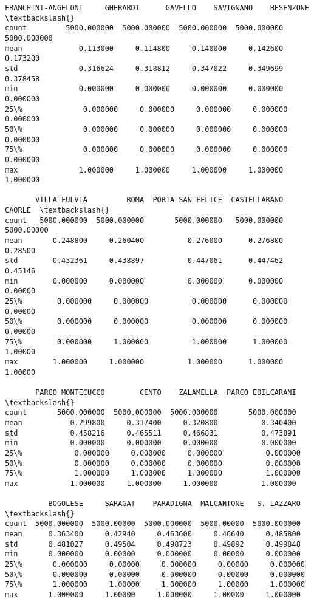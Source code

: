 \documentclass[11pt]{article}
\begin{document}
\begin{tcolorbox}[breakable, size=fbox, boxrule=.5pt, pad at break*=1mm, opacityfill=0]
\begin{Verbatim}[commandchars=\\\{\}]
       FRANCHINI-ANGELONI     GHERARDI      GAVELLO    SAVIGNANO    BESENZONE  \textbackslash{}
count         5000.000000  5000.000000  5000.000000  5000.000000  5000.000000
mean             0.113000     0.114800     0.140000     0.142600     0.173200
std              0.316624     0.318812     0.347022     0.349699     0.378458
min              0.000000     0.000000     0.000000     0.000000     0.000000
25\%              0.000000     0.000000     0.000000     0.000000     0.000000
50\%              0.000000     0.000000     0.000000     0.000000     0.000000
75\%              0.000000     0.000000     0.000000     0.000000     0.000000
max              1.000000     1.000000     1.000000     1.000000     1.000000

       VILLA FULVIA         ROMA  PORTA SAN FELICE  CASTELLARANO      CAORLE  \textbackslash{}
count   5000.000000  5000.000000       5000.000000   5000.000000  5000.00000
mean       0.248800     0.260400          0.276000      0.276800     0.28500
std        0.432361     0.438897          0.447061      0.447462     0.45146
min        0.000000     0.000000          0.000000      0.000000     0.00000
25\%        0.000000     0.000000          0.000000      0.000000     0.00000
50\%        0.000000     0.000000          0.000000      0.000000     0.00000
75\%        0.000000     1.000000          1.000000      1.000000     1.00000
max        1.000000     1.000000          1.000000      1.000000     1.00000

       PARCO MONTECUCCO        CENTO    ZALAMELLA  PARCO EDILCARANI  \textbackslash{}
count       5000.000000  5000.000000  5000.000000       5000.000000
mean           0.299800     0.317400     0.320800          0.340400
std            0.458216     0.465511     0.466831          0.473891
min            0.000000     0.000000     0.000000          0.000000
25\%            0.000000     0.000000     0.000000          0.000000
50\%            0.000000     0.000000     0.000000          0.000000
75\%            1.000000     1.000000     1.000000          1.000000
max            1.000000     1.000000     1.000000          1.000000

          BOGOLESE     SARAGAT    PARADIGNA  MALCANTONE   S. LAZZARO  \textbackslash{}
count  5000.000000  5000.00000  5000.000000  5000.00000  5000.000000
mean      0.363400     0.42940     0.463600     0.46640     0.485800
std       0.481027     0.49504     0.498723     0.49892     0.499848
min       0.000000     0.00000     0.000000     0.00000     0.000000
25\%       0.000000     0.00000     0.000000     0.00000     0.000000
50\%       0.000000     0.00000     0.000000     0.00000     0.000000
75\%       1.000000     1.00000     1.000000     1.00000     1.000000
max       1.000000     1.00000     1.000000     1.00000     1.000000


\end{Verbatim}
\end{tcolorbox}
\end{document}

